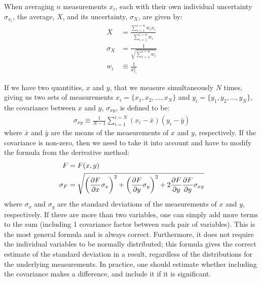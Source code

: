 When averaging $n$ measurements $x_i$, each with their own individual uncertainty $\sigma_{x_i}$, the average, $X$, and its uncertainty, $\sigma_{X}$, are given by:
\begin{align*}
X &= \frac{\sum_{i=1}^{i=n}w_ix_i}{\sum_{i=1}^{i=n}w_i}\\
\sigma_{X} &= \frac{1}{\sqrt{\sum_{i=1}^{i=n}w_i}}\\
w_i&\equiv\frac{1}{\sigma_{x_i}^2}
\end{align*}

If we have two quantities, $x$ and $y$, that we measure simultaneously $N$ times, giving us two sets of measurements  $x_i=\{x_1, x_2,\dots, x_N\}$ and $y_i=\{y_1, y_2,\dots, y_N\}$, the covariance between $x$ and $y$, $\sigma_{xy}$, is defined to be:
\begin{align}
\sigma_{xy}\equiv\frac{1}{N-1}\sum_{i=1}^{i=N}(x_i-\bar x)(y_i-\bar y)
\end{align}
where $\bar x$ and $\bar y$ are the means of the measurements of $x$ and $y$, respectively. If the covariance is non-zero, then we need to take it into account and have to modify the formula from the derivative method:
\begin{align}
F&=F(x,y)\nonumber\\
\sigma_{F} &= \sqrt{\left(\frac{\partial F}{\partial x}\sigma_x\right)^2 + \left(\frac{\partial F}{\partial y} \sigma_y\right)^2+2\frac{\partial F}{\partial y}\frac{\partial F}{\partial y}\sigma_{xy}}
\end{align}
where $\sigma_x$ and $\sigma_y$ are the standard deviations of the measurements of $x$ and $y$, respectively. If there are more than two variables, one can simply add more terms to the sum (including 1 covariance factor between each pair of variables). This is the most general formula and is always correct. Furthermore, it does not require the individual variables to be normally distributed; this formula gives the correct estimate of the standard deviation in a result, regardless of the distributions for the underlying measurements. In practice, one should estimate whether including the covariance makes a difference, and include it if it is significant.

